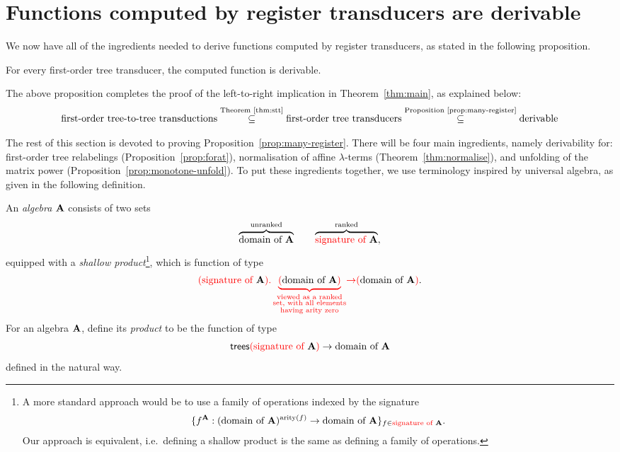 
\section{Functions computed by register transducers are derivable}
\label{sec:stt-derivable}
We now  have all of the ingredients needed to derive functions computed by register transducers, as stated in the following proposition.
\begin{proposition}
    \label{prop:many-register} 
For every first-order  tree transducer, the computed function is derivable. 
\end{proposition}
The above proposition  completes the proof of the left-to-right implication in Theorem~\ref{thm:main}, as explained below:
\begin{align*}
\text{first-order tree-to-tree transductions}  \stackrel {\text{Theorem~\ref{thm:stt}}}\subseteq  \text{first-order tree transducers} \stackrel {\text{Proposition~\ref{prop:many-register}}} \subseteq \text{derivable}
\end{align*}

The rest of this section is devoted to proving Proposition~\ref{prop:many-register}. There will be four main ingredients, namely derivability for: first-order tree relabelings (Proposition~\ref{prop:forat}), normalisation of affine $\lambda$-terms (Theorem~\ref{thm:normalise}), and unfolding of the matrix power (Proposition~\ref{prop:monotone-unfold}).
\label{sec:proof-of-prop} 
To put these ingredients together,  we use  terminology inspired by universal algebra, as given in the following definition. 

\begin{definition}
    An \emph{algebra} ${\color{black}\mathbf A}$ consists of two sets 
    \begin{align*}
    \overbrace{{\color{black}\text{domain of }}{\color{black}\mathbf A}}^{\text{unranked}} \qquad \overbrace{{\color{red}{\text{signature of }}}{\color{black}\mathbf A}}^{\text{ranked}},
    \end{align*}
equipped with a  \emph{shallow product}\footnote{
    A more standard approach would be to use a family of operations indexed by the signature
    \begin{align*}
    \{f^{\color{black}\mathbf A} : ({\color{black}\text{domain of }}{\color{black}\mathbf A})^{\mathrm{arity}(f)} \to {\color{black}\text{domain of }}{\color{black}\mathbf A}\}_{f \in {\color{red}{\text{signature of }}}{\color{black}\mathbf A}}.
    \end{align*}
   Our approach is equivalent, i.e.~defining a shallow product is the same as defining a family of operations.
}, which is function of type
\begin{align*}
 {\color{red}{({\color{red}{\text{signature of }}}{\color{black}\mathbf A}) . \underbrace{({\color{black}\text{domain of }}{\color{black}\mathbf A})}_{\substack{\text{viewed as a ranked}\\ \text{set, with all elements}\\ \text{having arity zero}}}}} {\color{red}{\to}} {\color{red}{(}}{\color{black}\text{domain of }}{\color{black}\mathbf A}{\color{red}{)}}.
\end{align*}
    For an algebra ${\color{black}\mathbf A}$, define its \emph{product} to be the function of type
    \begin{align*}
        \mathsf {trees} {\color{red}{(}}{\color{red}{\text{signature of }}}{\color{black}\mathbf A}{\color{red}{)}} \to {\color{black}\text{domain of }}{\color{black}\mathbf A}
    \end{align*}
    defined in the natural way.
\end{definition}



